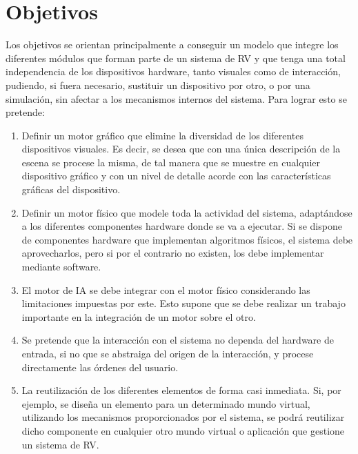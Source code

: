 \documentclass{egpubl}
\begin{document}
\section{Objetivos
\label{sec:objetivos}}


Los objetivos se orientan principalmente a conseguir un modelo que
integre los diferentes m\'odulos que forman parte de un sistema de RV y
que tenga una total independencia de los dispositivos hardware, tanto
visuales como de interacci\'on, pudiendo, si fuera necesario, sustituir
un dispositivo por otro, o por una simulaci\'on, sin afectar a los
mecanismos internos del sistema. Para lograr esto se pretende:


\begin{enumerate}
	\item Definir un motor gr\'afico que elimine la diversidad de los
	diferentes dispositivos visuales. Es decir, se desea que con una
	\'unica descripci\'on de la escena se procese la misma, de tal manera
	que se muestre en cualquier dispositivo gr\'afico y con un nivel de
	detalle acorde con las caracter\'isticas gr\'aficas del dispositivo.
	
	\item Definir un motor f\'isico que modele toda la actividad del
	sistema, adapt\'andose a los diferentes componentes hardware donde se
	va a ejecutar. Si se dispone de componentes hardware que implementan
	algoritmos f\'isicos, el sistema debe aprovecharlos, pero si por el
	contrario no existen, los debe implementar mediante software.
	
	\item El motor de IA se debe integrar con el motor f\'isico considerando
	las limitaciones impuestas por este. Esto supone que se debe realizar
	un trabajo importante en la integraci\'on de un motor sobre el otro.
	
	\item Se pretende que la interacci\'on con el sistema no dependa del
	hardware de entrada, si no que se abstraiga del origen de la
	interacci\'on, y procese directamente las \'ordenes del usuario.
	
	\item La reutilizaci\'on de los diferentes elementos de forma casi
	inmediata. Si, por ejemplo, se dise\~na un elemento para un determinado
	mundo virtual, utilizando los mecanismos proporcionados por el sistema,
	se podr\'a reutilizar dicho componente en cualquier otro mundo virtual
	o aplicaci\'on que gestione un sistema de RV.
\end{enumerate}
\end{document}

